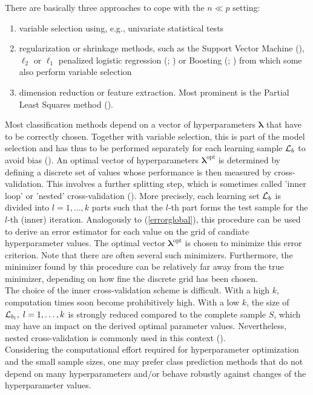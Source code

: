 There are basically three approaches to cope with the $n\ll p$ setting: 
\begin{enumerate}
\item variable selection using, e.g., univariate statistical tests
\item regularization or shrinkage methods, such as the Support Vector
      Machine (\citet{Boser1992}), $\ell_2$ or $\ell_1$ 
      penalized logistic regression (\citet{Zhu2004}; \citet{glmpath}) 
      or Boosting  (\citet{Friedman2001}; \citet{Buhlmann2003}) from
      which some also perform variable selection
\item dimension reduction or feature extraction. Most prominent is the 
      Partial Least Squares method (\citet{Boulesteixpls}). 
\end{enumerate}
Most classification methods depend on a vector of hyperparameters $\bm{\lambda}$
that have to be correctly chosen. Together with variable selection, this is part of the
model selection and has thus to be performed separately for each learning sample
$\mathcal L_b$ to avoid bias (\citet{modelselection}). An optimal vector of
hyperparameters $\bm{\lambda}^{\text{opt}}$ is determined by defining a discrete set of
values whose performance is then measured by cross-validation. This involves
a further splitting step, which is sometimes called 'inner loop' or 
'nested' cross-validation (\citet{Sta2005a}).
More precisely, each learning set $\mathcal L_b$ is divided into 
$l=1,\ldots,k$ parts such that the $l$-th part
forms the test sample for the $l$-th (inner) iteration. 
Analogously to (\ref{errorglobal}),
this procedure can be used to derive an error estimator for each value on the grid 
of candiate hyperparameter values. The optimal vector $\bm{\lambda}^{\text{opt}}$ 
is chosen to minimize this error criterion. Note that there are often several 
such minimizers. Furthermore, the 
minimizer found by this procedure can be relatively far away from the true minimizer,
depending on how fine the discrete grid has been chosen.\\
The choice of the inner cross-validation scheme is difficult.  With a high $k$, 
computation times soon become prohibitively high. With a low $k$, the size of 
$\mathcal L_{b_l}, \; l=1,\ldots,k$ is strongly reduced compared to the complete 
sample $S$, which may have an impact on the derived optimal parameter values.
Nevertheless, nested cross-validation is commonly used in this context 
 (\citet{review1}).\\

Considering the computational effort required for hyperparameter optimization and 
the small sample sizes, one may prefer class prediction methods 
that do not depend on many hyperparameters and/or behave robustly against changes
of the hyperparameter values.     

